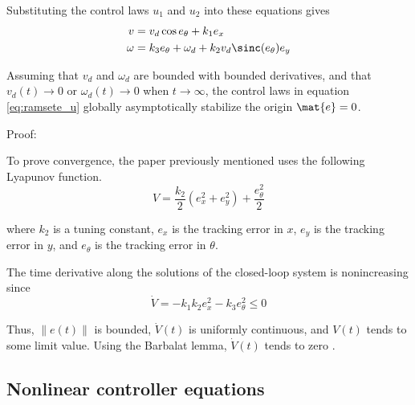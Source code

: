Substituting the control laws $u_1$ and $u_2$ into these equations gives
\begin{align*}
  v &= v_d\cos{e_\theta} + k_1 e_x \\
  \omega &= k_3 e_\theta + \omega_d + k_2 v_d \sinc(e_\theta) e_y
\end{align*}
\begin{theorem}
  \label{thm:ramsete_lyapunov_stability}

  Assuming that $v_d$ and $\omega_d$ are bounded with bounded derivatives, and
  that $v_d(t) \rightarrow 0$ or $\omega_d(t) \rightarrow 0$ when
  $t \rightarrow \infty$, the control laws in equation \eqref{eq:ramsete_u}
  globally asymptotically stabilize the origin $\mat{e} = 0$.

  Proof:

  To prove convergence, the paper previously mentioned uses the following
  Lyapunov function.
  \begin{equation*}
    V = \frac{k_2}{2}(e_x^2 + e_y^2) + \frac{e_\theta^2}{2}
  \end{equation*}

  where $k_2$ is a tuning constant, $e_x$ is the tracking error in $x$, $e_y$ is
  the tracking error in $y$, and $e_\theta$ is the tracking error in $\theta$.

  The time derivative along the solutions of the closed-loop \gls{system} is
  nonincreasing since
  \begin{equation*}
    \dot{V} = -k_1 k_2 e_x^2 - k_3 e_\theta^2 \leq 0
  \end{equation*}

  Thus, $\lVert e(t) \rVert$ is bounded, $\dot{V}(t)$ is uniformly continuous,
  and $V(t)$ tends to some limit value. Using the Barbalat lemma, $\dot{V}(t)$
  tends to zero \cite{bib:ctrl_wheeled_mobile_robots}.
\end{theorem}

\subsection{Nonlinear controller equations}

